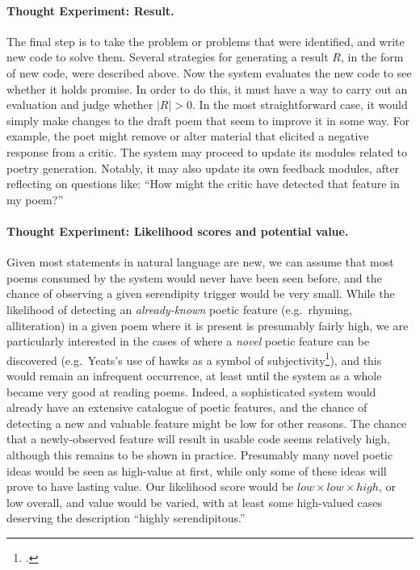 


\paragraph{Thought Experiment: Result.}

The final step is to take the problem or problems that were
identified, and write new code to solve them.  Several strategies for
generating a result $R$, in the form of new code, were described
above.  Now the system evaluates the new code to see whether it holds
promise.  In order to do this, it must have a way to carry out an
evaluation and judge whether $|R|>0$.  In the most straightforward
case, it would simply make changes to the draft poem that seem to
improve it in some way.  For example, the poet might remove or alter material that
elicited a negative response from a critic.  The system may proceed to
update its modules related to poetry generation.  Notably, it may also update its own
feedback modules, after reflecting on questions like: ``How might the
critic have detected that feature in my poem?''

\paragraph{Thought Experiment: Likelihood scores and potential value.}
Given most statements in natural language are new, we can assume that
most poems consumed by the system would never have been seen before,
and the chance of observing a given serendipity trigger would be very
small.  While the likelihood of detecting an \emph{already-known}
poetic feature (e.g.~rhyming, alliteration) in a given poem where it
is present is presumably fairly high, we are particularly interested
in the cases of where a \emph{novel} poetic feature can be discovered (e.g.~Yeats's use of hawks as a symbol of subjectivity\footnote{.}), and this
would remain an infrequent occurrence, at least until the system as a
whole became very good at reading poems.  Indeed, a sophisticated
system would already have an extensive catalogue of poetic features,
and the chance of detecting a new and valuable feature might be low
for other reasons.  The chance that a newly-observed feature will
result in usable code seems relatively high, although this remains to
be shown in practice.  Presumably many novel poetic ideas would be seen as
high-value at first, while only some of these ideas will prove to have
lasting value.  Our likelihood score would be
$\mathit{low}\times\mathit{low}\times\mathit{high}$, or low overall,
and value would be varied, with at least some high-valued cases
deserving the description ``highly serendipitous.''

